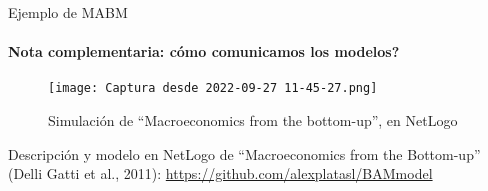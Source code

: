 \documentclass[11pt]{beamer}
\begin{document}
\begin{frame}{Ejemplo de MABM}
    \framesubtitle{Nota complementaria: cómo comunicamos los modelos?}
\begin{figure}
    \centering
    \texttt{[image: Captura desde 2022-09-27 11-45-27.png]}
 \small   \caption{Simulación de ``Macroeconomics from the bottom-up'', en NetLogo}
    \label{fig:my_label}
\end{figure}
Descripción y modelo en NetLogo de ``Macroeconomics from the Bottom-up'' (Delli Gatti et al., 2011):
\url{https://github.com/alexplatasl/BAMmodel}
    
\end{frame}
\end{document}
